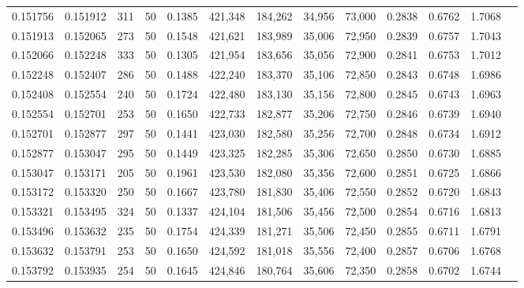 \begin{tabular}{rrrrrrrrrrrrr}
0.151756 & 0.151912 &   311 &  50 &                                     0.1385 & 421,348 & 184,262 &  34,956 &  73,000 & 0.2838 & 0.6762 & 1.7068 \\
0.151913 & 0.152065 &   273 &  50 &                                     0.1548 & 421,621 & 183,989 &  35,006 &  72,950 & 0.2839 & 0.6757 & 1.7043 \\
0.152066 & 0.152248 &   333 &  50 &                                     0.1305 & 421,954 & 183,656 &  35,056 &  72,900 & 0.2841 & 0.6753 & 1.7012 \\
0.152248 & 0.152407 &   286 &  50 &                                     0.1488 & 422,240 & 183,370 &  35,106 &  72,850 & 0.2843 & 0.6748 & 1.6986 \\
0.152408 & 0.152554 &   240 &  50 &                                     0.1724 & 422,480 & 183,130 &  35,156 &  72,800 & 0.2845 & 0.6743 & 1.6963 \\
0.152554 & 0.152701 &   253 &  50 &                                     0.1650 & 422,733 & 182,877 &  35,206 &  72,750 & 0.2846 & 0.6739 & 1.6940 \\
0.152701 & 0.152877 &   297 &  50 &                                     0.1441 & 423,030 & 182,580 &  35,256 &  72,700 & 0.2848 & 0.6734 & 1.6912 \\
0.152877 & 0.153047 &   295 &  50 &                                     0.1449 & 423,325 & 182,285 &  35,306 &  72,650 & 0.2850 & 0.6730 & 1.6885 \\
0.153047 & 0.153171 &   205 &  50 &                                     0.1961 & 423,530 & 182,080 &  35,356 &  72,600 & 0.2851 & 0.6725 & 1.6866 \\
0.153172 & 0.153320 &   250 &  50 &                                     0.1667 & 423,780 & 181,830 &  35,406 &  72,550 & 0.2852 & 0.6720 & 1.6843 \\
0.153321 & 0.153495 &   324 &  50 &                                     0.1337 & 424,104 & 181,506 &  35,456 &  72,500 & 0.2854 & 0.6716 & 1.6813 \\
0.153496 & 0.153632 &   235 &  50 &                                     0.1754 & 424,339 & 181,271 &  35,506 &  72,450 & 0.2855 & 0.6711 & 1.6791 \\
0.153632 & 0.153791 &   253 &  50 &                                     0.1650 & 424,592 & 181,018 &  35,556 &  72,400 & 0.2857 & 0.6706 & 1.6768 \\
0.153792 & 0.153935 &   254 &  50 &                                     0.1645 & 424,846 & 180,764 &  35,606 &  72,350 & 0.2858 & 0.6702 & 1.6744 \\

\end{tabular}
